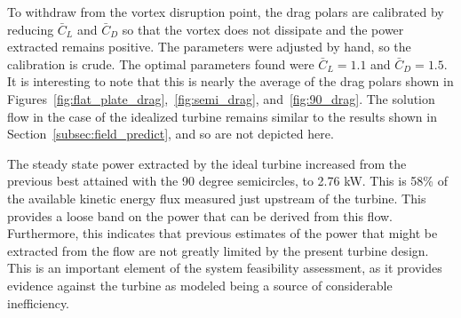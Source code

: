 
To withdraw from the vortex disruption point, the drag
polars are calibrated by reducing $\bar C_L $ and $\bar C_D$ so that the 
vortex does not dissipate and the power extracted remains positive. The
parameters were adjusted by hand, so the calibration is crude. The
optimal parameters found were $\bar C_L = 1.1$ and $\bar C_D = 1.5$. It
is interesting to note that this is nearly the average of the drag
polars shown in Figures~\ref{fig:flat_plate_drag},~\ref{fig:semi_drag}, 
and~\ref{fig:90_drag}. The solution flow in the case of the idealized
turbine remains similar to the results shown in
Section~\ref{subsec:field_predict}, and so are not depicted here. 

The steady state power extracted by the ideal turbine 
increased from the previous best attained with the 90 degree
semicircles, to 2.76 kW. This is 58\% of
the available kinetic energy flux measured just upstream of the turbine.
This provides a loose band on the power that can be derived from this
flow. Furthermore, this indicates that previous estimates of the power
that might be extracted from the flow are not greatly limited by the
present turbine design. This is an important element of the system
feasibility assessment, as it provides evidence against the turbine as
modeled being a source of considerable inefficiency.   


